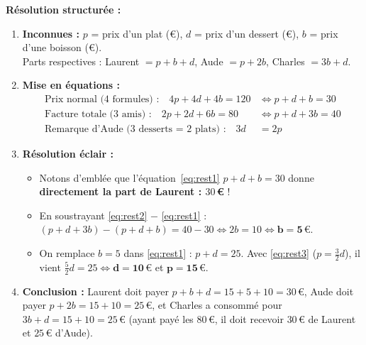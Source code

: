 \begin{exemple}
\textbf{Résolution structurée :}
\begin{enumerate}
    \item \textbf{Inconnues :} $p$ = prix d'un plat (€), $d$ = prix d'un dessert (€), $b$ = prix d'une boisson (€).\\
    Parts respectives : Laurent $= p + b + d$, Aude $= p + 2b$, Charles $= 3b + d$.
    \item \textbf{Mise en équations :}
    \begin{align}
        \text{Prix normal (4 formules) :}\quad 4p + 4d + 4b = 120 &\iff p + d + b = 30 \label{eq:rest1}\\
        \text{Facture totale (3 amis) :}\quad 2p + 2d + 6b = 80 &\iff p + d + 3b = 40 \label{eq:rest2}\\
        \text{Remarque d'Aude (3 desserts = 2 plats) :}\quad 3d &= 2p \label{eq:rest3}
    \end{align}
    \item \textbf{Résolution éclair :}
    \begin{itemize}
        \item Notons d'emblée que l'équation~\eqref{eq:rest1} $p + d + b = 30$ donne \textbf{directement la part de Laurent : $30$\,€} !
        \item En soustrayant \eqref{eq:rest2} $-$ \eqref{eq:rest1} : $(p + d + 3b) - (p + d + b) = 40 - 30 \iff 2b = 10 \iff \mathbf{b = 5\,\text{€}}$.
        \item On remplace $b = 5$ dans \eqref{eq:rest1} : $p + d = 25$. Avec \eqref{eq:rest3} ($p = \frac{3}{2}d$), il vient $\frac{5}{2}d = 25 \iff \mathbf{d = 10\,\text{€}}$ et $\mathbf{p = 15\,\text{€}}$.
    \end{itemize}
    \item \textbf{Conclusion :} Laurent doit payer $p + b + d = 15 + 5 + 10 = \boxed{30\,\text{€}}$, Aude doit payer $p + 2b = 15 + 10 = \boxed{25\,\text{€}}$, et Charles a consommé pour $3b + d = 15 + 10 = \boxed{25\,\text{€}}$ (ayant payé les $80$\,€, il doit recevoir $30$\,€ de Laurent et $25$\,€ d'Aude).
\end{enumerate}
\end{exemple}

